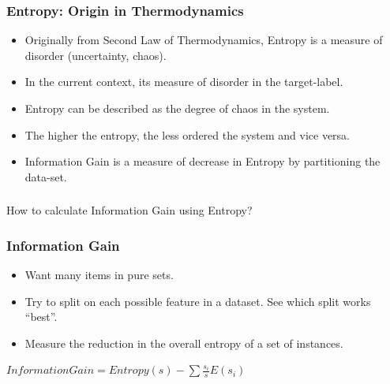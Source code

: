 \begin{frame}[fragile]\frametitle{Entropy: Origin in Thermodynamics}
\begin{itemize}
\item Originally from Second Law of Thermodynamics, Entropy is a measure of disorder (uncertainty, chaos).
\item In the current context, its measure of disorder in the target-label.
\item  Entropy can be described as the degree of chaos in the system.
\item The higher the entropy, the less ordered the system and vice versa.
\item Information Gain is a measure of decrease in Entropy by partitioning the data-set.
\end{itemize}
\end{frame}




\begin{frame}[fragile]\frametitle{}
\begin{center}
{\Large How to calculate Information Gain using Entropy?}
\end{center}
\end{frame}

\begin{frame}[fragile]\frametitle{Information Gain}
\begin{itemize}
\item Want many items in pure sets.
\item Try to split on each possible feature in a dataset. See which split works ``best''.
\item Measure the reduction in the overall entropy of a set of instances.
\end{itemize}
$InformationGain = Entropy(s) - \sum \frac{s_i}{s} E(s_i)$
\end{frame}



